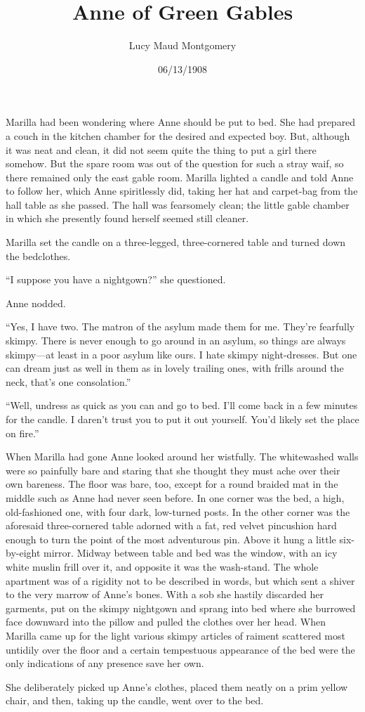 \documentclass[a4paper]{article}
\title{Anne of Green Gables}
\author{Lucy Maud Montgomery}
\date{06/13/1908}
\begin{document}
\maketitle

Marilla had been wondering where Anne should be put to bed. She had prepared a couch in the kitchen chamber for the desired and expected boy. But, although it was neat and clean, it did not seem quite the thing to put a girl there somehow. But the spare room was out of the question for such a stray waif, so there remained only the east gable room. Marilla lighted a candle and told Anne to follow her, which Anne spiritlessly did, taking her hat and carpet-bag from the hall table as she passed. The hall was fearsomely clean; the little gable chamber in which she presently found herself seemed still cleaner.

Marilla set the candle on a three-legged, three-cornered table and turned down the bedclothes.

\tiny{``I suppose you have a nightgown?'' she questioned.

Anne nodded.

``Yes, I have two. The matron of the asylum made them for me. They're fearfully skimpy. There is never enough to go around in an asylum, so things are always skimpy---at least in a poor asylum like ours. I hate skimpy night-dresses. But one can dream just as well in them as in lovely trailing ones, with frills around the neck, that's one consolation.''}

\scriptsize{``Well, undress as quick as you can and go to bed. I'll come back in a few minutes for the candle. I daren't trust you to put it out yourself. You'd likely set the place on fire.''

When Marilla had gone Anne looked around her wistfully. The whitewashed walls were so painfully bare and staring that she thought they must ache over their own bareness. The floor was bare, too, except for a round braided mat in the middle such as Anne had never seen before. In one corner was the bed, a high, old-fashioned one, with four dark, low-turned posts. In the other corner was the aforesaid three-cornered table adorned with a fat, red velvet pincushion hard enough to turn the point of the most adventurous pin. Above it hung a little six-by-eight mirror. Midway between table and bed was the window, with an icy white muslin frill over it, and opposite it was the wash-stand. The whole apartment was of a rigidity not to be described in words, but which sent a shiver to the very marrow of Anne's bones. With a sob she hastily discarded her garments, put on the skimpy nightgown and sprang into bed where she burrowed face downward into the pillow and pulled the clothes over her head. When Marilla came up for the light various skimpy articles of raiment scattered most untidily over the floor and a certain tempestuous appearance of the bed were the only indications of any presence save her own.

She deliberately picked up Anne's clothes, placed them neatly on a prim yellow chair, and then, taking up the candle, went over to the bed.}
\end{document}
